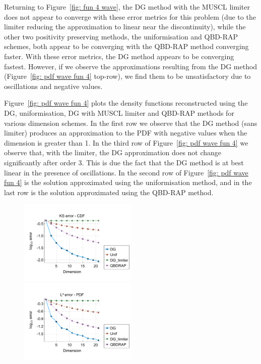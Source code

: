 \begin{example}
Returning to Figure~\ref{fig: fun 4 wave}, the DG method with the MUSCL limiter does not appear to converge with these error metrics for this problem (due to the limiter reducing the approximation to linear near the discontinuity), while the other two positivity preserving methods, the uniformisation and QBD-RAP schemes, both appear to be converging with the QBD-RAP method converging faster. With these error metrics, the DG method appears to be converging fastest. However, if we observe the approximations resulting from the DG method (Figure~\ref{fig: pdf wave fun 4} top-row), we find them to be unsatisfactory due to oscillations and negative values. 

Figure~\ref{fig: pdf wave fun 4} plots the density functions reconstructed using the DG, uniformisation, DG with MUSCL limiter and QBD-RAP methods for various dimension schemes. In the first row we observe that the DG method (sans limiter) produces an approximation to the PDF with negative values when the dimension is greater than 1. In the third row of Figure~\ref{fig: pdf wave fun 4} we observe that, with the limiter, the DG approximation does not change significantly after order 3. This is due the fact that the DG method is at best linear in the presence of oscillations. In the second row of Figure~\ref{fig: pdf wave fun 4} is the solution approximated using the uniformisation method, and in the last row is the solution approximated using the QBD-RAP method. 
\begin{figure}[h]
	\centering
	\includegraphics[width=0.5\textwidth,trim={0.75cm 0.8cm 0.25cm 1.25cm},clip]{chapter6/figs/wave/fun4/meshs_ks_error_formatted.pdf}%
	\includegraphics[width=0.5\textwidth,trim={0.75cm 0.8cm 0.25cm 1.25cm},clip]{chapter6/figs/wave/fun4/meshs_l2_pdf_error_formatted.pdf}

\end{figure}
\end{example}
